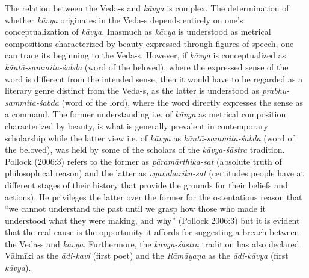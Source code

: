 The relation between the Veda-s and \textsl{kāvya} is complex. The determination of whether \textsl{kāvya} originates in the Veda-s depends entirely on one's conceptualization of \textsl{kāvya}. Inasmuch as \textsl{kāvya} is understood as metrical compositions characterized by beauty expressed through figures of speech, one can trace its beginning to the Veda-s. However, if \textsl{kāvya} is conceptualized as \textsl{kāntā-sammita-śabda} (word of the beloved), where the expressed sense of the word is different from the intended sense, then it would have to be regarded as a literary genre distinct from the Veda-s, as the latter is understood as \textsl{prabhu-sammita-śabda} (word of the lord), where the word directly expresses the sense as a command. The former understanding i.e. of \textsl{kāvya} as metrical composition characterized by beauty, is what is generally prevalent in contemporary scholarship while the latter view i.e. of \textsl{kāvya} as \textsl{kāntā-sammita-śabda} (word of the beloved), was held by some of the scholars of the \textsl{kāvya-śāstra} tradition. Pollock (2006:3) refers to the former as \textsl{pāramārthika-sat} (absolute truth of philosophical reason) and the latter as \textsl{vyāvahārika-sat} (certitudes people have at different stages of their history that provide the grounds for their beliefs and actions). He privileges the latter over the former for the ostentatious reason that ``we cannot understand the past until we grasp how those who made it understood what they were making, and why'' (Pollock 2006:3) but it is evident that the real cause is the opportunity it affords for suggesting a breach between the \hbox{Veda-s} and \textsl{kāvya}. Furthermore, the \textsl{kāvya-śāstra} tradition has also declared Vālmīki as the \textsl{ādi-kavi} (first poet) and the \textsl{Rāmāyaṇa} as the \textsl{ādi-kāvya} (first \textsl{kāvya}).

